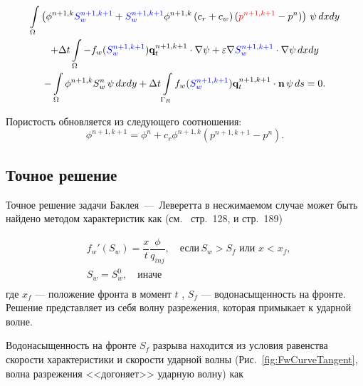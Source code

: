 \begin{multline}
	\int\limits_\Omega \left(\phi^{n+1,k} {\color{blue}S_w^{n+1,k+1}} + {\color{blue}S_w^{n+1,k+1}}\phi^{n+1,k}\left(c_r + c_w \right)({\color{red}p^{n+1,k+1}} - p^n)  \right)\,\psi \,dx dy \\
	+ \Delta t\int\limits_\Omega -f_w ({\color{blue}S_w^{n+1,k+1}}) \mathbf{q}_t^{n+1, k+1} \cdot \nabla \psi +  \varepsilon \nabla {\color{blue}S_w^{n+1,k+1}} \cdot \nabla \psi \,dx dy \\
	-\int\limits_\Omega \phi^{n+1,k} S_w^{n} \,\psi \,dx dy
	+\Delta t\int\limits_{\Gamma_R} f_w({\color{blue}S_w^{n+1,k+1}}) \mathbf{q}_t^{n+1, k+1} \cdot \mathbf{n} \,\psi \, ds = 0.
\end{multline}

Пористость обновляется из следующего соотношения:
\begin{equation}
	\phi^{n+1, k+1} = \phi^n + c_r \phi^{n+1, k} (p^{n+1, k+1} - p^n).
\end{equation}

\subsection{Точное решение }

Точное решение задачи Баклея~---~Леверетта в несжимаемом случае может быть найдено методом характеристик как (см.~\cite{Barenblatt_Entov_Ryzhik_1984} стр.~128, и \cite{Collins_1984} стр.~189)

\begin{equation}\label{exactSol_test}
	\begin{split}
		& f_w'(S_w) = \dfrac{x}{t} \dfrac{\phi}{q_{inj}}, \quad \text{если}\, S_w > S_f \text{ или } x < x_f, \\
		 & S_w=S_w^0, \quad \text{иначе} \\
	\end{split}
	\end{equation}
	где $x_f$ --- положение фронта в момент $t$ , $S_f$ --- водонасыщенность на фронте.
Решение представляет из себя волну разрежения, которая примыкает к ударной волне.

Водонасыщенность на фронте $S_f$ разрыва находится из условия равенства скорости характеристики и скорости ударной волны (Рис.~\ref{fig:FwCurveTangent}, волна разрежения <<догоняет>> ударную волну) как

